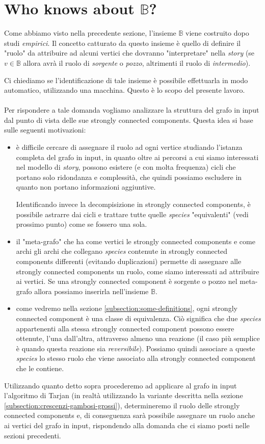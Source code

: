 \section{Who knows about $\mathbb{B}$?}
Come abbiamo visto nella precedente sezione, l'insieme $\mathbb{B}$
viene costruito dopo studi \emph{empirici}. Il concetto catturato da
questo insieme \`e quello di definire il "ruolo" da attribuire ad
alcuni vertici che dovranno "interpretare" nella \emph{story} (se $v
\in \mathbb{B}$ allora avr\`a il ruolo di \emph{sorgente} o
\emph{pozzo}, altrimenti il ruolo di \emph{intermedio}).

Ci chiediamo se l'identificazione di tale insieme \`e possibile
effettuarla in modo automatico, utilizzando una macchina. Questo \`e
lo scopo del presente lavoro.
\\\\
Per rispondere a tale domanda vogliamo analizzare la struttura del
grafo in input dal punto di vista delle sue strongly connected
components. Questa idea si base sulle seguenti motivazioni:
\begin{itemize}
\item \`e difficile cercare di assegnare il ruolo ad ogni vertice
  studiando l'istanza completa del grafo in input, in quanto oltre ai
  percorsi a cui siamo interessati nel modello di \emph{story},
  possono esistere (e con molta frequenza) cicli che portano solo
  ridondanza e complessit\`a, che quindi possiamo escludere in quanto
  non portano informazioni aggiuntive. 

  Identificando invece la decompisizione in strongly connected
  components, \`e possibile astrarre dai cicli e trattare tutte quelle
  \emph{species} "equivalenti" (vedi prossimo punto) come se fossero
  una sola.
\item il "meta-grafo" che ha come vertici le strongly connected
  components e come archi gli archi che collegano \emph{species}
  contenute in strongly connected components differenti (evitando
  duplicazioni) permette di assegnare alle strongly connected
  components un ruolo, come siamo interessati ad attribuire ai
  vertici. Se una strongly connected component \`e sorgente o pozzo
  nel meta-grafo allora possiamo inserirla nell'insieme $\mathbb{B}$.
\item come vedremo nella sezione \ref{subsection:some-definitions},
  ogni strongly connected component \`e una classe di
  equivalenza. Ci\`o significa che due \emph{species} appartenenti
  alla stessa strongly connected component possono essere ottenute,
  l'una dall'altra, attraverso almeno una reazione (il caso pi\`u
  semplice \`e quando questa reazione sia
  \emph{reversibile}). Possiamo quindi associare a queste
  \emph{species} lo stesso ruolo che viene associato alla strongly
  connected component che le contiene.
\end{itemize}
Utilizzando quanto detto sopra procederemo ad applicare al grafo in
input l'algoritmo di Tarjan (in realt\`a utilizzando la variante
descritta nella sezione \ref{subsection:crescenzi-gambosi-grossi}),
determineremo il ruolo delle strongly connected components e, di
conseguenza sar\`a possibile assegnare un ruolo anche ai vertici del
grafo in input, rispondendo alla domanda che ci siamo posti nelle
sezioni precedenti.


